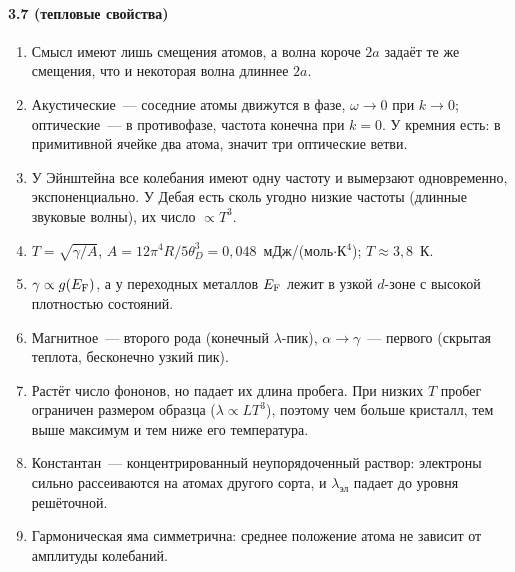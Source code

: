 {\paragraph{3.7 (тепловые свойства)}
\begin{enumerate}[label=\arabic*.]
\item Смысл имеют лишь смещения атомов, а волна короче $2a$ задаёт те же
смещения, что и некоторая волна длиннее $2a$.
\item Акустические~— соседние атомы движутся в фазе, $\omega\to0$ при
$k\to0$; оптические~— в противофазе, частота конечна при $k=0$. У кремния
есть: в примитивной ячейке два атома, значит три оптические ветви.
\item У Эйнштейна все колебания имеют одну частоту и вымерзают
одновременно, экспоненциально. У Дебая есть сколь угодно низкие частоты
(длинные звуковые волны), их число $\propto T^3$.
\item $T=\sqrt{\gamma/A}$, $A=12\pi^4R/5\theta_D^3=0{,}048$~мДж/(моль$\cdot$К$^4$);
$T\approx3{,}8$~К.
\item $\gamma\propto g(E_{\mathrm{F}})$, а у переходных металлов $E_{\mathrm{F}}$ лежит в узкой
$d$-зоне с высокой плотностью состояний.
\item Магнитное~— второго рода (конечный $\lambda$-пик), $\alpha\to\gamma$~—
первого (скрытая теплота, бесконечно узкий пик).
\item Растёт число фононов, но падает их длина пробега. При низких $T$
пробег ограничен размером образца ($\lambda\propto LT^3$), поэтому чем больше
кристалл, тем выше максимум и тем ниже его температура.
\item Константан~— концентрированный неупорядоченный раствор: электроны
сильно рассеиваются на атомах другого сорта, и $\lambda_\text{эл}$ падает до
уровня решёточной.
\item Гармоническая яма симметрична: среднее положение атома не зависит
от амплитуды колебаний.
\end{enumerate}

}
